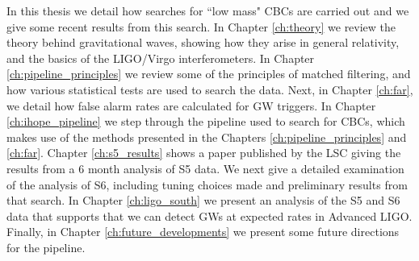 In this thesis we detail how searches for ``low mass" \acp{CBC} are carried out and we give some recent results from this search. In Chapter \ref{ch:theory} we review the theory behind gravitational waves, showing how they arise in general relativity, and the basics of the \ac{LIGO}/Virgo interferometers. In Chapter \ref{ch:pipeline_principles} we review some of the principles of matched filtering, and how various statistical tests are used to search the data. Next, in Chapter \ref{ch:far}, we detail how false alarm rates are calculated for \ac{GW} triggers. In Chapter \ref{ch:ihope_pipeline} we step through the pipeline used to search for \acp{CBC}, which makes use of the methods presented in the Chapters \ref{ch:pipeline_principles} and \ref{ch:far}. Chapter \ref{ch:s5_results} shows a paper published by the \ac{LSC} giving the results from a $6$ month analysis of \ac{S5} data. We next give a detailed examination of the analysis of \ac{S6}, including tuning choices made and preliminary results from that search. In Chapter \ref{ch:ligo_south} we present an analysis of the \ac{S5} and \ac{S6} data that supports that we can detect \acp{GW} at expected rates in Advanced \ac{LIGO}. Finally, in Chapter \ref{ch:future_developments} we present some future directions for the pipeline.



